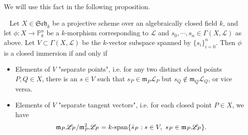 \documentclass[11pt,a4paper,footinclude=true,headinclude=true]{scrbook} %
\newcommand{\LL}{\mathscr{L}}
\newcommand{\PP}{\mathbb{P}}
\newcommand{\mm}{\mathfrak{m}}
\newcommand{\Sch}{\mathfrak{Sch}}
\newcommand{\<}{\langle}
\newcommand{\>}{\rangle}
\newcommand{\spn}{\mathchar`-\mathrm{span}}
\newenvironment{proposition}[2][]
{\renewcommand\theinnercustomprop{#2}\innercustomprop[#1] 
\begin{mdframed}[backgroundcolor=gray!20]\ }
{\end{mdframed}\endinnercustomprop}
\begin{document}
We will use this fact in the following proposition.

\newpage
\begin{proposition}{7.3}
    Let $X\in\Sch_k$ be a projective scheme over an algebraically closed field $k$, and let $\phi:X\to\PP_k^n$ be a $k$-morphism corresponding to $\LL$ and $s_0,\cdots,s_n\in\Gamma(X,\LL)$ as above. Let $V\subset\Gamma(X,\LL)$ be the $k$-vector subspace spanned by $\{s_i\}_{i=0}^n$. Then $\phi$ is a closed immersion if and only if 
    \begin{itemize}
        \item[(1)] Elements of $V$ "separate points", i.e. for any two distinct closed points $P,Q\in X$, there is an $s\in V$ such that $s_P\in\mm_P\LL_P$ but $s_Q\notin\mm_Q\LL_Q$, or vice versa.
        \item[(2)] Elements of $V$ "separate tangent vectors", i.e. for each closed point $P\in X$, we have
        \begin{align*}
            \mm_P\LL_P/\mm_P^2\LL_P=k\spn\{\bar{s}_P:s\in V,\ s_P\in\mm_P\LL_P\}.
        \end{align*}
    \end{itemize}
\end{proposition}
\end{document}
